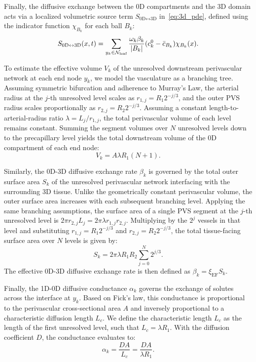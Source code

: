 \documentclass[fleqn,10pt]{wlscirep}
\begin{document}
Finally, the diffusive exchange between the 0D compartments and the 3D domain acts via a localized volumetric source term $S_{\text{0D} \leftrightarrow \text{3D}}$ in~\eqref{eq:3d_pde}, defined using the indicator function $\chi_{B_k}$ for each ball $B_k$:
\begin{equation}
  S_{\text{0D} \leftrightarrow \text{3D}}(x, t) = \sum_{y_k \in \mathcal{N}_{\rm leaf}} \frac{\omega_k \beta_k}{|B_k|} (c^0_k - \bar{c}_{B_k}) \chi_{B_k}(x).
  \label{eq:3d_source}
\end{equation}

To estimate the effective volume $V_k$ of the unresolved downstream perivascular network at each end node $y_k$, we model the vasculature as a branching tree. Assuming symmetric bifurcation and adherence to Murray's Law, the arterial radius at the $j$-th unresolved level scales as $r_{1,j} = R_1 2^{-j/3}$, and the outer PVS radius scales proportionally as $r_{2,j} = R_2 2^{-j/3}$. Assuming a constant length-to-arterial-radius ratio $\lambda = L_j / r_{1,j}$, the total perivascular volume of each level remains constant. Summing the segment volumes over $N$ unresolved levels down to the precapillary level yields the total downstream volume of the 0D compartment of each end node:
\begin{equation}
  V_k = A \lambda R_1 (N + 1).
  \label{eq:effective_volume}
\end{equation}

Similarly, the 0D-3D diffusive exchange rate $\beta_k$ is governed by the total outer surface area $S_k$ of the unresolved perivascular network interfacing with the surrounding 3D tissue. Unlike the geometrically constant perivascular volume, the outer surface area increases with each subsequent branching level. Applying the same branching assumptions, the surface area of a single PVS segment at the $j$-th unresolved level is $2 \pi r_{2,j} L_j = 2 \pi \lambda r_{1,j} r_{2,j}$. Multiplying by the $2^j$ vessels in that level and substituting $r_{1,j} = R_1 2^{-j/3}$ and $r_{2,j} = R_2 2^{-j/3}$, the total tissue-facing surface area over $N$ levels is given by:
\begin{equation}
  S_k = 2 \pi \lambda R_1 R_2 \sum_{j=0}^{N} 2^{j/3}.
  \label{eq:surface_area}
\end{equation}
The effective 0D-3D diffusive exchange rate is then defined as $\beta_k = \xi_{\text{EF}} S_k$.

Finally, the 1D-0D diffusive conductance $\alpha_k$ governs the exchange of solutes across the interface at $y_k$. Based on Fick's law, this conductance is proportional to the perivascular cross-sectional area $A$ and inversely proportional to a characteristic diffusion length $L_c$. We define the characteristic length $L_c$ as the length of the first unresolved level, such that $L_c = \lambda R_1$. With the diffusion coefficient $D$, the conductance evaluates to:
\begin{equation}
  \alpha_k = \frac{D A}{L_c} = \frac{D A}{\lambda R_1}.
  \label{eq:conductance}
\end{equation}
\end{document}

